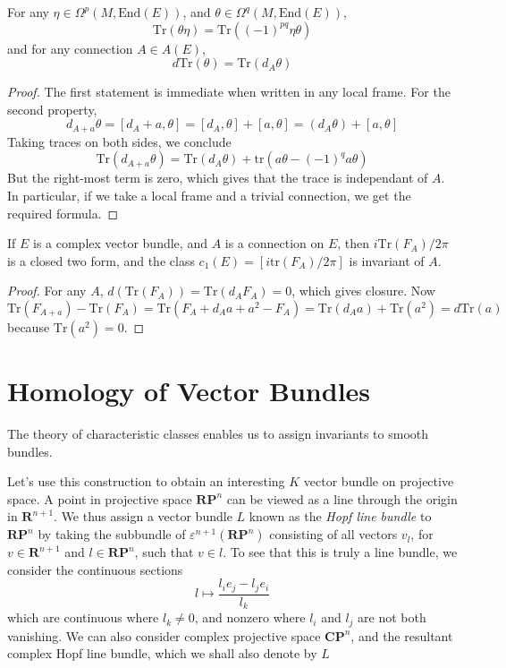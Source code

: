 \begin{lemma}
    For any $\eta \in \Omega^p(M,\text{End}(E))$, and $\theta \in \Omega^q(M,\text{End}(E))$,
    \[ \text{Tr}(\theta \eta) = \text{Tr}((-1)^{pq} \eta \theta) \]
    and for any connection $A \in A(E)$,
    \[ d \text{Tr}(\theta) = \text{Tr}(d_A \theta) \]
\end{lemma}
\begin{proof}
    The first statement is immediate when written in any local frame. For the second property,
    \[ d_{A + a} \theta = [d_A + a, \theta] = [d_A, \theta] + [a, \theta] = (d_A \theta) + [a,\theta] \]
    Taking traces on both sides, we conclude
    \[ \text{Tr}(d_{A + a} \theta) = \text{Tr}(d_A \theta) + \text{tr}(a \theta - (-1)^q a \theta) \]
    But the right-most term is zero, which gives that the trace is independant of $A$. In particular, if we take a local frame and a trivial connection, we get the required formula.
\end{proof}

\begin{theorem}
    If $E$ is a complex vector bundle, and $A$ is a connection on $E$, then $i \text{Tr}(F_A)/2\pi$ is a closed two form, and the class $c_1(E) = [i \text{tr}(F_A)/2 \pi]$ is invariant of $A$.
\end{theorem}
\begin{proof}
    For any $A$, $d(\text{Tr}(F_A)) = \text{Tr}(d_A F_A) = 0$, which gives closure. Now
    \[ \text{Tr}(F_{A + a}) - \text{Tr}(F_A) = \text{Tr}(F_A + d_A a + a^2 - F_A) = \text{Tr}(d_A a) + \text{Tr}(a^2) = d \text{Tr}(a) \]
    because $\text{Tr}(a^2) = 0$.
\end{proof}















\chapter{Homology of Vector Bundles}

The theory of characteristic classes enables us to assign invariants to smooth bundles.

Let's use this construction to obtain an interesting $K$ vector bundle on projective space. A point in projective space $\mathbf{RP}^n$ can be viewed as a line through the origin in $\mathbf{R}^{n+1}$. We thus assign a vector bundle $L$ known as the \emph{Hopf line bundle} to $\mathbf{RP}^n$ by taking the subbundle of $\varepsilon^{n+1}(\mathbf{RP}^n)$ consisting of all vectors $v_l$, for $v \in \mathbf{R}^{n+1}$ and $l \in \mathbf{RP}^n$, such that $v \in l$. To see that this is truly a line bundle, we consider the continuous sections
%
\[ l \mapsto \frac{l_i e_j - l_j e_i}{l_k} \]
%
which are continuous where $l_k \neq 0$, and nonzero where $l_i$ and $l_j$ are not both vanishing. We can also consider complex projective space $\mathbf{CP}^n$, and the resultant complex Hopf line bundle, which we shall also denote by $L$

